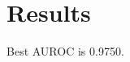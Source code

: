 \documentclass{article}
\begin{document}
\begin{abstract}
One two three four five.
\end{abstract}
\section{Results}
Best AUROC is 0.9750.
\end{document}
